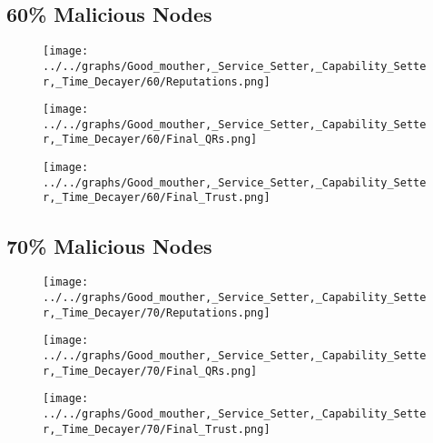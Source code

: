 \begin{minipage}[t]{0.49\columnwidth}
\subsection*{60\% Malicious Nodes}
    \begin{figure}[H]
        \centering
        \texttt{[image: ../../graphs/Good\_mouther,\_Service\_Setter,\_Capability\_Setter,\_Time\_Decayer/60/Reputations.png]}
    \end{figure}
    \begin{figure}[H]
        \centering
        \texttt{[image: ../../graphs/Good\_mouther,\_Service\_Setter,\_Capability\_Setter,\_Time\_Decayer/60/Final\_QRs.png]}
    \end{figure}
\end{minipage}
\begin{minipage}[t]{0.49\columnwidth}
    \begin{figure}[H]
        \centering
        \texttt{[image: ../../graphs/Good\_mouther,\_Service\_Setter,\_Capability\_Setter,\_Time\_Decayer/60/Final\_Trust.png]}
    \end{figure}
\end{minipage}

\begin{minipage}[t]{0.49\columnwidth}
\subsection*{70\% Malicious Nodes}
    \begin{figure}[H]
        \centering
        \texttt{[image: ../../graphs/Good\_mouther,\_Service\_Setter,\_Capability\_Setter,\_Time\_Decayer/70/Reputations.png]}
    \end{figure}
    \begin{figure}[H]
        \centering
        \texttt{[image: ../../graphs/Good\_mouther,\_Service\_Setter,\_Capability\_Setter,\_Time\_Decayer/70/Final\_QRs.png]}
    \end{figure}
\end{minipage}
\begin{minipage}[t]{0.49\columnwidth}
    \begin{figure}[H]
        \centering
        \texttt{[image: ../../graphs/Good\_mouther,\_Service\_Setter,\_Capability\_Setter,\_Time\_Decayer/70/Final\_Trust.png]}
    \end{figure}
\end{minipage}

